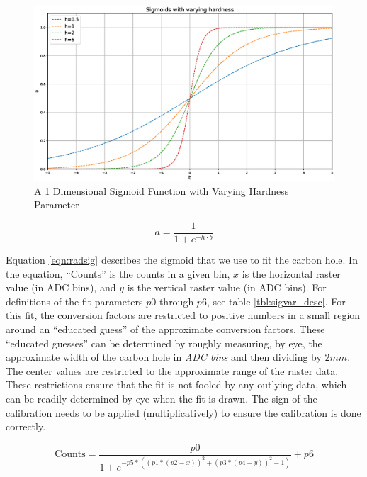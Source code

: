 \begin{figure}
	\includegraphics[width=\textwidth]{./app1/figures/sig_hard.eps}
	\caption{A 1 Dimensional Sigmoid Function with Varying Hardness Parameter}
	\label{fig:sighard}
\end{figure}

\begin{equation}
	a = \frac{1}{1 + e^{-h\cdot b}}
	\label{eqn:base_sig}
\end{equation}


Equation \ref{eqn:radsig} describes the sigmoid that we use to fit the carbon hole. In the equation, ``Counts'' is the counts in a given bin, $x$ is the horizontal raster value (in ADC bins), and $y$ is the vertical raster value (in ADC bins). For definitions of the fit parameters $p0$ through $p6$, see table \ref{tbl:sigvar_desc}. For this fit, the conversion factors are restricted to positive numbers in a small region around an ``educated guess'' of the approximate conversion factors. These ``educated guesses'' can be determined by roughly measuring, by eye, the approximate width of the carbon hole in \textit{ADC bins} and then dividing by $2mm$. The center values are restricted to the approximate range of the raster data. These restrictions ensure that the fit is not fooled by any outlying data, which can be readily determined by eye when the fit is drawn. The sign of the calibration needs to be applied (multiplicatively) to ensure the calibration is done correctly.

\begin{equation}
\mathrm{Counts} = \frac{p0}{1+e^{-p5*\left(\left(p1*\left(p2-x\right)\right)^{2}+\left(p3*\left(p4-y\right)\right)^{2}-1\right)}}+p6
\label{eqn:radsig}
\end{equation}


